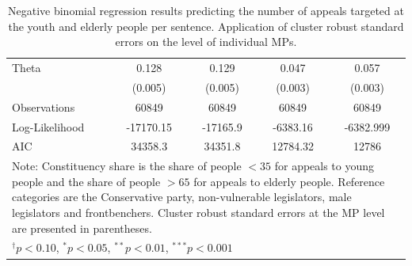 \begin{table}[H]
\begin{tabular}{lcccc}
Theta & 0.128 & 0.129 & 0.047 & 0.057 \\
    & (0.005) & (0.005) & (0.003) & (0.003) \\
\midrule
Observations & 60849 & 60849 & 60849 & 60849 \\
Log-Likelihood & -17170.15 & -17165.9 & -6383.16 & -6382.999 \\
AIC & 34358.3 & 34351.8 & 12784.32 & 12786 \\
\midrule
\multicolumn{5}{p{0.9\linewidth}}{\footnotesize Note: Constituency share is the share of people $<35$ for appeals to young people and the share of people $>65$ for appeals to elderly people. Reference categories are the Conservative party, non-vulnerable legislators, male legislators and frontbenchers. Cluster robust standard errors at the MP level are presented in parentheses.} \\
\multicolumn{5}{l}{\footnotesize $^{\dagger}p<0.10$, $^{*}p<0.05$, $^{**}p<0.01$, $^{***}p<0.001$} \\
\bottomrule
\end{tabular}
\caption[Negative binomial regression predicting number of age-based appeals per sentence]{Negative binomial regression results predicting the number of appeals targeted at the youth and elderly people per sentence. Application of cluster robust standard errors on the level of individual MPs.}
\label{tab:neb_bin_regression}
\end{table}